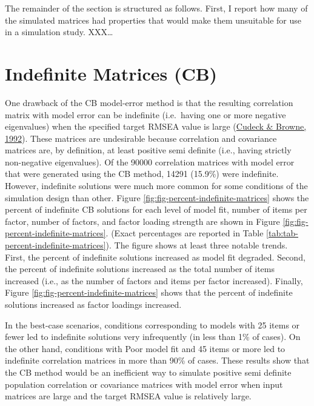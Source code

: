 \documentclass[11pt]{umnthesis}
\begin{document}
The remainder of the section is structured as follows. First, I report how many of the simulated matrices had properties that would make them unsuitable for use in a simulation study. XXX\ldots{}

\hypertarget{indefinite-matrices-cb}{%
\section{Indefinite Matrices (CB)}\label{indefinite-matrices-cb}}

One drawback of the CB model-error method is that the resulting correlation matrix with model error can be indefinite (i.e.~having one or more negative eigenvalues) when the specified target RMSEA value is large (\protect\hyperlink{ref-cudeck1992}{Cudeck \& Browne, 1992}). These matrices are undesirable because correlation and covariance matrices are, by definition, at least positive semi definite (i.e., having strictly non-negative eigenvalues). Of the 90000 correlation matrices with model error that were generated using the CB method, 14291 (15.9\%) were indefinite. However, indefinite solutions were much more common for some conditions of the simulation design than other. Figure \ref{fig:fig-percent-indefinite-matrices} shows the percent of indefinite CB solutions for each level of model fit, number of items per factor, number of factors, and factor loading strength are shown in Figure \ref{fig:fig-percent-indefinite-matrices}. (Exact percentages are reported in Table \ref{tab:tab-percent-indefinite-matrices}). The figure shows at least three notable trends. First, the percent of indefinite solutions increased as model fit degraded. Second, the percent of indefinite solutions increased as the total number of items increased (i.e., as the number of factors and items per factor increased). Finally, Figure \ref{fig:fig-percent-indefinite-matrices} shows that the percent of indefinite solutions increased as factor loadings increased.

In the best-case scenarios, conditions corresponding to models with 25 items or fewer led to indefinite solutions very infrequently (in less than 1\% of cases). On the other hand, conditions with Poor model fit and 45 items or more led to indefinite correlation matrices in more than 90\% of cases. These results show that the CB method would be an inefficient way to simulate positive semi definite population correlation or covariance matrices with model error when input matrices are large and the target RMSEA value is relatively large.
\end{document}
